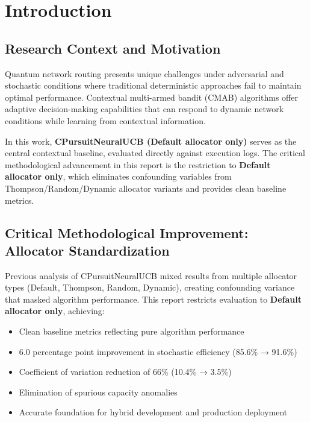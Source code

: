 \documentclass[12pt,a4paper]{article}
\newcommand{\primarytext}[1]{\textcolor{primaryblue}{\textbf{#1}}}
\begin{document}
\newpage
\section{Introduction}

\subsection{Research Context and Motivation}

Quantum network routing presents unique challenges under adversarial and stochastic conditions where traditional deterministic approaches fail to maintain optimal performance. Contextual multi-armed bandit (CMAB) algorithms offer adaptive decision-making capabilities that can respond to dynamic network conditions while learning from contextual information.

In this work, \primarytext{CPursuitNeuralUCB (Default allocator only)} serves as the central contextual baseline, evaluated directly against execution logs. The critical methodological advancement in this report is the restriction to \textbf{Default allocator only}, which eliminates confounding variables from Thompson/Random/Dynamic allocator variants and provides clean baseline metrics.

\subsection{Critical Methodological Improvement: Allocator Standardization}

Previous analysis of CPursuitNeuralUCB mixed results from multiple allocator types (Default, Thompson, Random, Dynamic), creating confounding variance that masked algorithm performance. This report restricts evaluation to \textbf{Default allocator only}, achieving:

\begin{itemize}
    \item Clean baseline metrics reflecting pure algorithm performance
    \item 6.0 percentage point improvement in stochastic efficiency (85.6\% → 91.6\%)
    \item Coefficient of variation reduction of 66\% (10.4\% → 3.5\%)
    \item Elimination of spurious capacity anomalies
    \item Accurate foundation for hybrid development and production deployment
\end{itemize}
\end{document}
